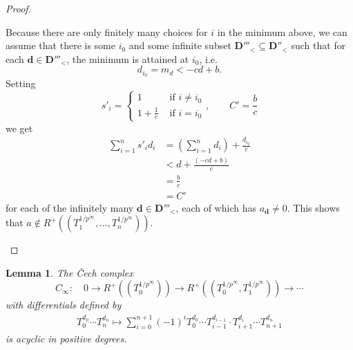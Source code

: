 \documentclass[10pt,twoside]{article}
\numberwithin{equation}{section}
\theoremstyle{plain}
\newtheorem{mylemma}[mythm]{Lemma}
\theoremstyle{definition}
\newcommand{\Cech}{\v{C}ech }
\newcommand{\pRoots}{{1/p^\infty}}
\begin{document}
\begin{proof}
\begin{itemize}
        Because there are only finitely many choices for \(i\) in the minimum above, we can assume that there is some \(i_0\) and some infinite subset \(\mathbf D'''_<\subseteq \mathbf D''_<\) such that for each \(\mathbf d\in \mathbf D'''_<\), the minimum is attained at \(i_0\), i.e. 
        \[d_{i_0}=m_d < -cd+b.\]
        Setting
        \[s'_i=\begin{cases}1 \quad &\text{ if } i\neq i_0\\1+\frac 1c&\text{ if } i=i_0\end{cases}, \qquad C'=\frac bc\]
        we get 
        \begin{align*}
            \sum_{i=1}^n s'_id_i
            &=\left(\sum_{i=1}^n d_i \right)+ \frac{d_{i_0}}c\\
            &< d+\frac{(-cd+b)}c\\
            &=\frac b c \\
            &=C'
        \end{align*}
        for each of the infinitely many \(\mathbf d\in \mathbf{D}'''_<\), each of which has \(a_{\mathbf d}\neq 0\). This shows that \(a\notin R^+((T_1^{\pRoots},\dots, T_n^{\pRoots}))\).
    \end{itemize}
\end{proof}

\begin{mylemma}\label{KimExtCechCalculation}
    The \Cech complex
    \[C_\infty\colon \quad0 \longrightarrow R^+((T_0^{\pRoots}))\longrightarrow  R^+((T_0^{\pRoots}, T_1^{\pRoots}))\longrightarrow\cdots\]
    with differentials defined by
    \begin{align*}\tag{**}\label{KimExtDifferential}
        T_0^{d_0}\cdots T_n^{d_n}\mapsto \sum_{i=0}^{n+1} (-1)^i T_0^{d_0}\cdots T_{i-1}^{d_{i-1}}\cdot T_{i+1}^{d_i}\cdots T_{n+1}^{d_n}
    \end{align*}
    is acyclic in positive degrees.
\end{mylemma}
\end{document}
